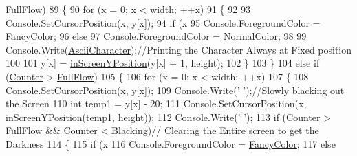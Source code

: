 \begin{DoxyCode}
      \hyperlink{classmatrix_1_1_program_a33abdd7b74a13e027d920fddb65cce35}{FullFlow})
89             \{
90                 \textcolor{keywordflow}{for} (x = 0; x < width; ++x)
91                 \{
92 
93                     Console.SetCursorPosition(x, y[x]);
94                     \textcolor{keywordflow}{if} (x %
95                         Console.ForegroundColor = \hyperlink{classmatrix_1_1_program_a20f58f721e0c5cdf3b4f519bb7ef872a}{FancyColor};
96                     \textcolor{keywordflow}{else}
97                         Console.ForegroundColor = \hyperlink{classmatrix_1_1_program_ab208e57b1469c5728605ac04b0eae86c}{NormalColor};
98 
99                     Console.Write(\hyperlink{classmatrix_1_1_program_ae4f0df2b9f302e657820ea236f831664}{AsciiCharacter});\textcolor{comment}{//Printing the Character Always at Fixed
       position}
100 
101                     y[x] = \hyperlink{classmatrix_1_1_program_ae800bb3943994a4c6d5595fcb01370c5}{inScreenYPosition}(y[x] + 1, height);
102                 \}
103             \}
104             \textcolor{keywordflow}{else} \textcolor{keywordflow}{if} (\hyperlink{classmatrix_1_1_program_a7ebfe2b7ace6afb02108a7d38abb6f1b}{Counter} > \hyperlink{classmatrix_1_1_program_a33abdd7b74a13e027d920fddb65cce35}{FullFlow})
105             \{
106                 \textcolor{keywordflow}{for} (x = 0; x < width; ++x)
107                 \{
108                     Console.SetCursorPosition(x, y[x]);
109                     Console.Write(\textcolor{charliteral}{' '});\textcolor{comment}{//Slowly blacking out the Screen}
110                     \textcolor{keywordtype}{int} temp1 = y[x] - 20;
111                     Console.SetCursorPosition(x, \hyperlink{classmatrix_1_1_program_ae800bb3943994a4c6d5595fcb01370c5}{inScreenYPosition}(temp1, height));
112                     Console.Write(\textcolor{charliteral}{' '});
113                     \textcolor{keywordflow}{if} (\hyperlink{classmatrix_1_1_program_a7ebfe2b7ace6afb02108a7d38abb6f1b}{Counter} > \hyperlink{classmatrix_1_1_program_a33abdd7b74a13e027d920fddb65cce35}{FullFlow} && \hyperlink{classmatrix_1_1_program_a7ebfe2b7ace6afb02108a7d38abb6f1b}{Counter} < 
      \hyperlink{classmatrix_1_1_program_a48b4255583a63007038c6c61bd50672b}{Blacking})\textcolor{comment}{// Clearing the Entire screen to get the Darkness}
114                     \{
115                         \textcolor{keywordflow}{if} (x %
116                             Console.ForegroundColor = \hyperlink{classmatrix_1_1_program_a20f58f721e0c5cdf3b4f519bb7ef872a}{FancyColor};
117                         \textcolor{keywordflow}{else}

\end{DoxyCode}
